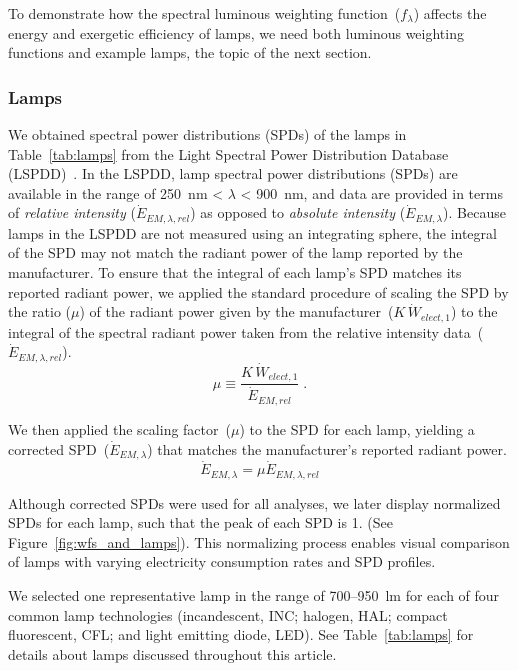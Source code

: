 \documentclass[energies,article,accept,moreauthors,pdftex]{Definitions/mdpi}\usepackage[]{graphicx}\usepackage[]{color}
\newcommand{\rev}[2]{#2}
\providecommand{\DIFdelbegin}{} %
\newcommand{\DIFscaledelfig}{0.5}
\newlength{\DIFdelgraphicswidth} %
\newlength{\DIFdelgraphicsheight} %
\newcommand{\DIFdelincludegraphics}[2][]{%
\sbox{\DIFdelgraphicsbox}{\DIFOincludegraphics[#1]{#2}}%
\settoboxwidth{\DIFdelgraphicswidth}{\DIFdelgraphicsbox} %
\settoboxtotalheight{\DIFdelgraphicsheight}{\DIFdelgraphicsbox} %
\scalebox{\DIFscaledelfig}{%
\parbox[b]{\DIFdelgraphicswidth}{\usebox{\DIFdelgraphicsbox}\\[-\baselineskip] \rule{\DIFdelgraphicswidth}{0em}}\llap{\resizebox{\DIFdelgraphicswidth}{\DIFdelgraphicsheight}{%
\setlength{\unitlength}{\DIFdelgraphicswidth}%
\begin{picture}(1,1)%
\thicklines\linethickness{2pt} %
{\color[rgb]{1,0,0}\put(0,0){\framebox(1,1){}}}%
{\color[rgb]{1,0,0}\put(0,0){\line( 1,1){1}}}%
{\color[rgb]{1,0,0}\put(0,1){\line(1,-1){1}}}%
\end{picture}%
}\hspace*{3pt}}} %
} %
\DeclareRobustCommand{\DIFdelbegin}{\DIFOdelbegin \let\includegraphics\DIFdelincludegraphics} %
\begin{document}
To demonstrate how the spectral luminous weighting function~($f_\lambda$)
affects the energy and exergetic efficiency of lamps, 
we need both luminous weighting functions and
example lamps, the topic of the next section.


\subsubsection{Lamps}
\label{sec:lamps}

We obtained spectral power distributions (SPDs) of the lamps in Table~\ref{tab:lamps} from the 
Light Spectral Power Distribution Database (LSPDD)~\cite{Roby, miguel2017, aube2013}.  {In the LSPDD, 
lamp spectral power distributions (SPDs) are available in the range of 
250~nm < $\lambda$ < 900~nm, and} data  are provided 
in terms of \emph{relative intensity} ($\dot{E}_{EM,\lambda,rel}$) 
as opposed to \emph{absolute intensity} ($\dot{E}_{EM,\lambda}$).
Because lamps in the LSPDD are not measured using an \DIFdelbegin %
integrating  sphere,
the integral of the SPD may not match the radiant power of the lamp
reported by the manufacturer.
To ensure that the integral of each lamp's SPD 
matches its reported radiant power, 
we applied the standard procedure of scaling the SPD 
by the ratio ($\mu$) of
the radiant power given by the manufacturer~($K \, \dot{W}_{elect,1}$) to  
the integral of the spectral radiant power taken from the relative intensity data~($\dot{E}_{EM,\lambda,rel}$).
\begin{equation} 
  \mu \equiv \frac{K \, \dot{W}_{elect,1}}{\dot{E}_{EM,rel}} \; .
\end{equation}

We then applied the scaling factor~($\mu$) to the SPD for each lamp, 
yielding a corrected SPD~($\dot{E}_{EM,\lambda}$)
that matches the manufacturer's reported radiant power. 
\begin{equation} 
  \dot{E}_{EM,\lambda}  = \mu \dot{E}_{EM,\lambda,rel}
\end{equation}

Although corrected SPDs were used for all analyses,
we later display normalized SPDs for each lamp,
such that the peak of each SPD is 1.
(See Figure~\ref{fig:wfs_and_lamps}).
This normalizing process enables visual comparison 
of lamps with varying electricity consumption rates
and SPD profiles.

We selected one representative lamp in the range of 700--950~lm
for each of four common lamp technologies
(incandescent, INC;
halogen, HAL;
compact fluorescent, CFL; and
light emitting diode, LED).
See Table~\ref{tab:lamps} for details about lamps discussed throughout this article.
\end{document}
